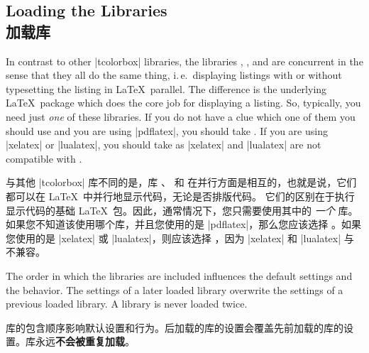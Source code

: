 \subsection{Loading the Libraries\\加载库}

In contrast to other |tcolorbox| libraries, the libraries
, , and  are concurrent in the sense that
they all do the same thing, i.\,e.\ displaying listings with or without typesetting
the listing in \LaTeX\ parallel.
The difference is the underlying \LaTeX\ package which does the core job for
displaying a listing. So, typically, you need just \emph{one} of these
libraries. If you do not have a clue which one of them you should use
and you are using |pdflatex|, you should take .
If you are using |xelatex| or |lualatex|, you should take 
as |xelatex| and |lualatex| are not compatible with .

与其他 |tcolorbox| 库不同的是，库 、 和  在并行方面是相互的，也就是说，它们都可以在 \LaTeX\ 中并行地显示代码，无论是否排版代码。 它们的区别在于执行显示代码的基础 \LaTeX\ 包。因此，通常情况下，您只需要使用其中的 \emph{一个} 库。如果您不知道该使用哪个库，并且您使用的是 |pdflatex|，那么您应该选择 。如果您使用的是 |xelatex| 或 |lualatex|，则应该选择 ，因为 |xelatex| 和 |lualatex| 与  不兼容。



\begin{marker}
The order in which the libraries are included influences the default settings and
the  behavior. The settings of a later loaded library overwrite
the settings of a previous loaded library. A library is never loaded twice.

库的包含顺序影响默认设置和行为。后加载的库的设置会覆盖先前加载的库的设置。库永远{\bf 不会被重复加载}。
\end{marker}
